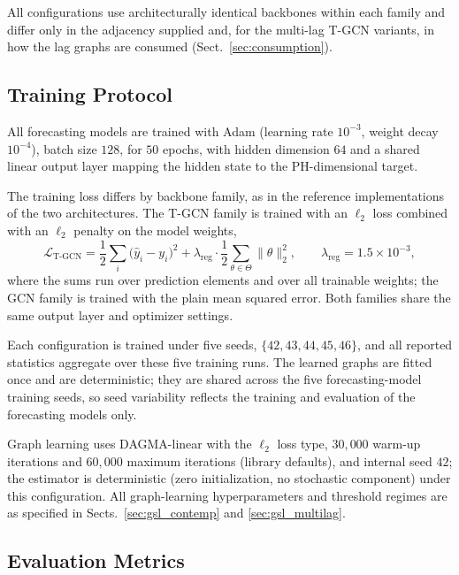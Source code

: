 All configurations use architecturally identical backbones within each
family and differ only in the adjacency supplied and, for the multi-lag
T-GCN variants, in how the lag graphs are consumed
(Sect.~\ref{sec:consumption}).

\subsection{Training Protocol}\label{sec:training}

All forecasting models are trained with Adam (learning rate $10^{-3}$, weight
decay $10^{-4}$), batch size $128$, for $50$ epochs, with hidden dimension
$64$ and a shared linear output layer mapping the hidden state to the
$\mathrm{PH}$-dimensional target.

The training loss differs by backbone family, as in the reference
implementations of the two architectures. The T-GCN family is trained with an
$\ell_2$ loss combined with an $\ell_2$ penalty on the model weights,
\[
\mathcal{L}_{\text{T-GCN}}
= \frac{1}{2}\sum_{i}\bigl(\hat{y}_i-y_i\bigr)^{2}
+ \lambda_{\text{reg}} \cdot \frac{1}{2}\sum_{\theta\in\Theta}\lVert\theta\rVert_2^2,
\qquad \lambda_{\text{reg}}=1.5\times 10^{-3},
\]
where the sums run over prediction elements and over all trainable weights;
the GCN family is trained with the plain mean squared error. Both families
share the same output layer and optimizer settings.

Each configuration is trained under five seeds,
$\{42,43,44,45,46\}$, and all reported statistics aggregate over these five
training runs. The learned graphs are fitted once and are deterministic; they
are shared across the five forecasting-model training seeds, so seed
variability reflects the training and evaluation of the forecasting models
only.

Graph learning uses DAGMA-linear \citep{Bello2024DAGMA} with the $\ell_2$
loss type, $30{,}000$ warm-up iterations and $60{,}000$ maximum iterations
(library defaults), and internal seed $42$; the estimator is deterministic
(zero initialization, no stochastic component) under this configuration. All
graph-learning hyperparameters and threshold regimes are as specified in
Sects.~\ref{sec:gsl_contemp} and \ref{sec:gsl_multilag}.

\subsection{Evaluation Metrics}\label{sec:metrics}

